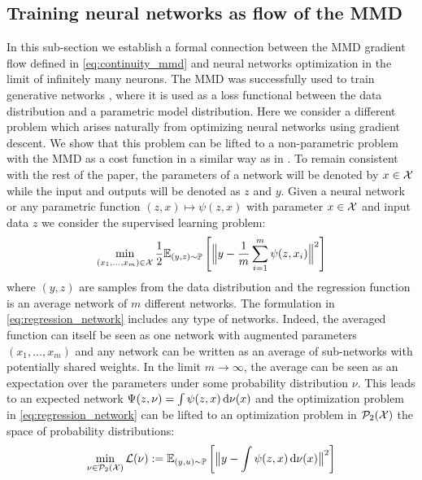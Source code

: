 \subsection{Training neural networks as flow of the MMD}\label{subsec:training_neural_networks}
In this sub-section we establish a formal connection between the MMD gradient flow defined in \cref{eq:continuity_mmd} and neural networks optimization in the limit of infinitely many neurons.
The MMD was successfully used to train generative networks \cite{Arbel:2018,Binkowski:2018}, where it is used as a loss functional between the data distribution and a parametric model distribution.
Here we consider a different problem which arises naturally from optimizing neural networks using gradient descent. We show that this problem can be lifted to a non-parametric problem with the MMD as a cost function in a similar way as in \cite{Rotskoff:2019}. To remain consistent with the rest of the paper, the parameters of a network will be denoted by $x\in {{\mathcal X}}$ while the input and outputs will be denoted as $z$ and $y$.
 Given a neural network or any parametric function $(z,x)\mapsto \psi(z,x)$ with parameter $x \in {{\mathcal X}} $ and input data $z$ we consider the supervised learning problem:
\begin{align}\label{eq:regression_network}
	\min_{(x_1,...,x_m )\in {{\mathcal X}}} \frac{1}{2}\mathbb{E}_{(y,z)\sim \mathbb{P}  } \left[ \Big\Vert y - \frac{1}{m}\sum_{i=1}^m\psi(z,x_i) \Big\Vert^2 \right ]
\end{align}
where $(y,z)$ are samples from the data distribution and the regression function is an average network of $m$ different networks. The formulation in \cref{eq:regression_network} includes any type of networks. Indeed, the averaged function can itself be seen as one network with augmented parameters $(x_1,...,x_m)$ and any network can be written as an average of sub-networks with potentially shared weights. In the limit $m\rightarrow \infty$, the average can be seen as an expectation over the parameters under some probability distribution $\nu$. This leads to an expected network $\Psi(z,\nu) =  \int \psi(z,x) \mathop{}\!\mathrm{d} \nu(x) $ and the optimization problem in \cref{eq:regression_network} can be lifted to an optimization problem in $\mathcal{P}_2({{\mathcal X}})$ the space of probability distributions:
\begin{align}\label{eq:lifted_regression}
	\min_{\nu \in \mathcal{P}_2({{\mathcal X}})}  \mathcal{L}(\nu) :=  \mathbb{E}_{(y,u)\sim \mathbb{P} } \left [ \big\Vert y - \int \psi(z,x) \mathop{}\!\mathrm{d} \nu(x) \big\Vert^2 \right ]
\end{align} 
